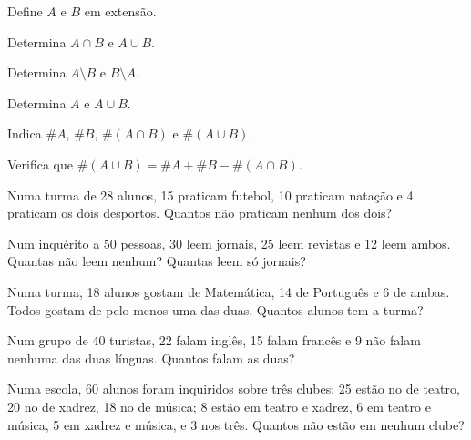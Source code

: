 \documentclass[12pt]{article}
\begin{document}
\begin{center}
\end{center}

\begin{exercicios}
  \item Define $A$ e $B$ em extensão.
  \item Determina $A \cap B$ e $A \cup B$.
  \item Determina $A \setminus B$ e $B \setminus A$.
  \item Determina $\overline{A}$ e $\overline{A \cup B}$.
  \item Indica $\#A$, $\#B$, $\#(A \cap B)$ e $\#(A \cup B)$.
  \item Verifica que $\#(A \cup B) = \#A + \#B - \#(A \cap B)$.
\end{exercicios}

\begin{exercicios}
  \item Numa turma de 28 alunos, 15 praticam futebol, 10 praticam natação e 4 praticam os dois desportos. Quantos não praticam nenhum dos dois?
  \item Num inquérito a 50 pessoas, 30 leem jornais, 25 leem revistas e 12 leem ambos. Quantas não leem nenhum? Quantas leem só jornais?
  \item Numa turma, 18 alunos gostam de Matemática, 14 de Português e 6 de ambas. Todos gostam de pelo menos uma das duas. Quantos alunos tem a turma?
  \item Num grupo de 40 turistas, 22 falam inglês, 15 falam francês e 9 não falam nenhuma das duas línguas. Quantos falam as duas?
  \item Numa escola, 60 alunos foram inquiridos sobre três clubes: 25 estão no de teatro, 20 no de xadrez, 18 no de música; 8 estão em teatro e xadrez, 6 em teatro e música, 5 em xadrez e música, e 3 nos três. Quantos não estão em nenhum clube?
\end{exercicios}
\end{document}

